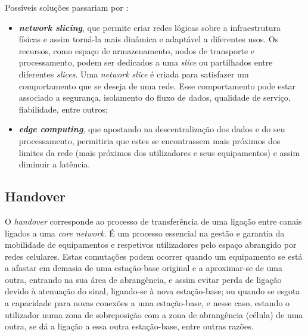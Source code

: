 \documentclass{llncs}
\begin{document}
Possíveis soluções passariam por :
\begin{itemize}
	\item \textit{\textbf{network slicing}}, que permite criar redes lógicas sobre a infraestrutura físicas e assim torná-la mais dinâmica e adaptável a diferentes usos. Os recursos, como espaço de armazenamento, nodos de transporte e processamento, podem ser dedicados a uma \textit{slice} ou partilhados entre diferentes \textit{slices}. Uma \textit{network slice} é criada para satisfazer um comportamento que se deseja de uma rede. Esse comportamento pode estar associado a segurança, isolamento do fluxo de dados, qualidade de serviço, fiabilidade, entre outros;
	\item \textit{\textbf{edge computing}}, que apostando na descentralização dos dados e do seu processamento, permitiria que estes se encontrassem mais próximos dos limites da rede (mais próximos dos utilizadores e seus equipamentos) e assim diminuir a latência.
\end{itemize}

\subsection{Handover}

O \textit{handover} corresponde ao processo de transferência de uma ligação entre canais ligados a uma \textit{core network}. É um processo essencial na gestão e garantia da mobilidade de equipamentos e respetivos utilizadores pelo espaço abrangido por redes celulares. Estas comutações podem ocorrer quando um equipamento se está a afastar em demasia de uma estação-base original e a aproximar-se de uma outra, entrando na sua área de abrangência, e assim evitar perda de ligação devido à atenuação do sinal, ligando-se à nova estação-base; ou quando se esgota a capacidade para novas conexões a uma estação-base, e nesse caso, estando o utilizador numa zona de sobreposição com a zona de abrangência (célula) de uma outra, se dá a ligação a essa outra estação-base, entre outras razões.
\end{document}
